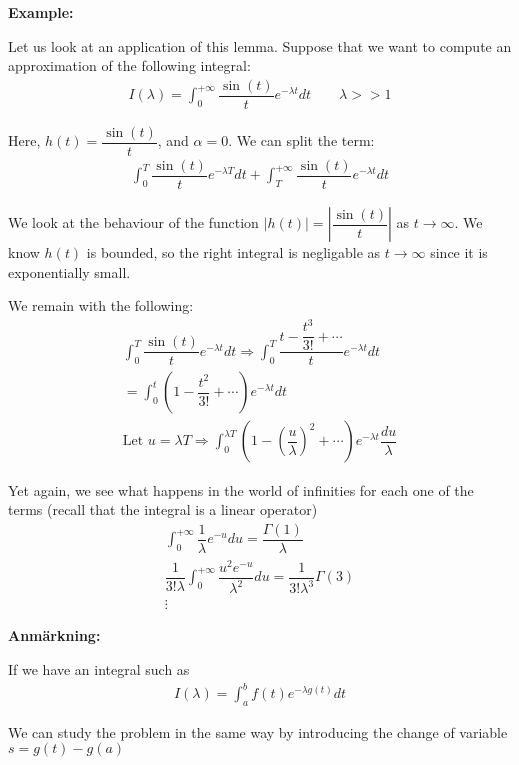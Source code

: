 \par\bigskip
\noindent\textbf{Example:}\par
\noindent Let us look at an application of this lemma. Suppose that we want to compute an approximation of the following integral:
\begin{equation*}
  \begin{gathered}
    I(\lambda) = \int_{0}^{+\infty}\dfrac{\sin(t)}{t}e^{-\lambda t}dt\qquad\lambda >>1
  \end{gathered}
\end{equation*}
\par\bigskip
\noindent Here, $h(t) = \dfrac{\sin(t)}{t}$, and $\alpha = 0$. We can split the term:
\begin{equation*}
  \begin{gathered}
    \int_{0}^{T}\dfrac{\sin(t)}{t}e^{-\lambda T}dt+\int_{T}^{+\infty}\dfrac{\sin(t)}{t}e^{-\lambda t}dt
  \end{gathered}
\end{equation*}\par
\noindent We look at the behaviour of the function $\left|h(t)\right|= \left|\dfrac{\sin(t)}{t}\right|$ as $t\to\infty$. We know $h(t)$ is bounded, so the right integral is negligable as $t\to\infty$ since it is exponentially small.\par
\noindent We remain with the following:
\begin{equation*}
  \begin{gathered}
    \int_{0}^{T}\dfrac{\sin(t)}{t}e^{-\lambda t} dt \Rightarrow\int_{0}^{T}\dfrac{t-\dfrac{t^3}{3!}+\cdots}{t}e^{-\lambda t}dt\\
    = \int_{0}^{t}\left(1-\dfrac{t^2}{3!}+\cdots\right)e^{-\lambda t}dt\\
    \text{Let } u = \lambda T\Rightarrow \int_{0}^{\lambda T}\left(1-\left(\dfrac{u}{\lambda}\right)^2+\cdots\right)e^{-\lambda t} \dfrac{du}{\lambda}
  \end{gathered}
\end{equation*}
\par\bigskip
\noindent Yet again, we see what happens in the world of infinities for each one of the terms (recall that the integral is a linear operator)
\begin{equation*}
  \begin{gathered}
    \int_{0}^{+\infty}\dfrac{1}{\lambda}e^{-u}du = \dfrac{\Gamma(1)}{\lambda}\\
    \dfrac{1}{3!\lambda}\int_{0}^{+\infty}\dfrac{u^2e^{-u}}{\lambda^2}du = \dfrac{1}{3!\lambda^3}\Gamma(3)\\
    \vdots
  \end{gathered}
\end{equation*}
\par\bigskip
\noindent\textbf{Anmärkning:}\par
\noindent If we have an integral such as
\begin{equation*}
  \begin{gathered}
    I(\lambda) = \int_{a}^{b}f(t)e^{ -\lambda g(t)} dt
  \end{gathered}
\end{equation*}\par
\noindent We can study the problem in the same way by introducing the change of variable $s = g(t)-g(a)$
